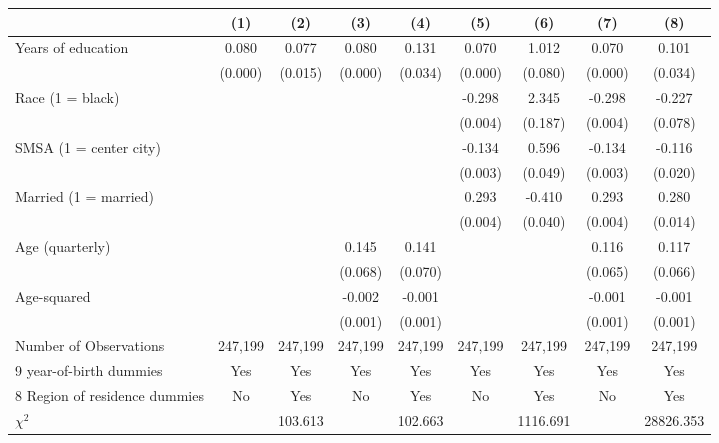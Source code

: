 {
\def\sym#1{\ifmmode^{#1}\else\(^{#1}\)\fi}
\begin{tabular}{l*{8}{c}}
\hline\hline
                    &\multicolumn{1}{c}{(1)}&\multicolumn{1}{c}{(2)}&\multicolumn{1}{c}{(3)}&\multicolumn{1}{c}{(4)}&\multicolumn{1}{c}{(5)}&\multicolumn{1}{c}{(6)}&\multicolumn{1}{c}{(7)}&\multicolumn{1}{c}{(8)}\\
\hline
Years of education  &       0.080&       0.077&       0.080&       0.131&       0.070&       1.012&       0.070&       0.101\\
                    &     (0.000)&     (0.015)&     (0.000)&     (0.034)&     (0.000)&     (0.080)&     (0.000)&     (0.034)\\
Race (1 = black)    &            &            &            &            &      -0.298&       2.345&      -0.298&      -0.227\\
                    &            &            &            &            &     (0.004)&     (0.187)&     (0.004)&     (0.078)\\
SMSA (1 = center city)&            &            &            &            &      -0.134&       0.596&      -0.134&      -0.116\\
                    &            &            &            &            &     (0.003)&     (0.049)&     (0.003)&     (0.020)\\
Married (1 = married)&            &            &            &            &       0.293&      -0.410&       0.293&       0.280\\
                    &            &            &            &            &     (0.004)&     (0.040)&     (0.004)&     (0.014)\\
Age (quarterly)     &            &            &       0.145&       0.141&            &            &       0.116&       0.117\\
                    &            &            &     (0.068)&     (0.070)&            &            &     (0.065)&     (0.066)\\
Age-squared         &            &            &      -0.002&      -0.001&            &            &      -0.001&      -0.001\\
                    &            &            &     (0.001)&     (0.001)&            &            &     (0.001)&     (0.001)\\
\hline
Number of Observations&     247,199&     247,199&     247,199&     247,199&     247,199&     247,199&     247,199&     247,199\\
9 year-of-birth dummies&         Yes&         Yes&         Yes&         Yes&         Yes&         Yes&         Yes&         Yes\\
8 Region of residence dummies&          No&         Yes&          No&         Yes&          No&         Yes&          No&         Yes\\
$\chi^2$            &            &     103.613&            &     102.663&            &    1116.691&            &   28826.353\\
\hline\hline
\end{tabular}
}
